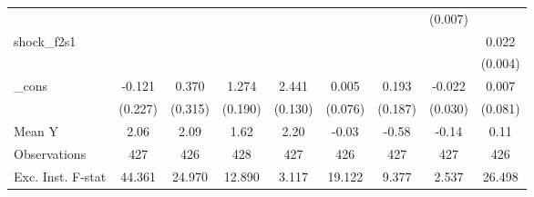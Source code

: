 {\begin{tabular}{l*{8}{c}}
            &                     &                     &                     &                     &                     &                     &     (0.007)         &                     \\
\addlinespace
shock\_f2s1  &                     &                     &                     &                     &                     &                     &                     &       0.022\sym{***}\\
            &                     &                     &                     &                     &                     &                     &                     &     (0.004)         \\
\addlinespace
\_cons      &      -0.121         &       0.370         &       1.274\sym{***}&       2.441\sym{***}&       0.005         &       0.193         &      -0.022         &       0.007         \\
            &     (0.227)         &     (0.315)         &     (0.190)         &     (0.130)         &     (0.076)         &     (0.187)         &     (0.030)         &     (0.081)         \\
\midrule
Mean Y      &        2.06         &        2.09         &        1.62         &        2.20         &       -0.03         &       -0.58         &       -0.14         &        0.11         \\
Observations&         427         &         426         &         428         &         427         &         426         &         427         &         427         &         426         \\
Exc. Inst. F-stat&      44.361         &      24.970         &      12.890         &       3.117         &      19.122         &       9.377         &       2.537         &      26.498         \\
\bottomrule
\end{tabular}
}
